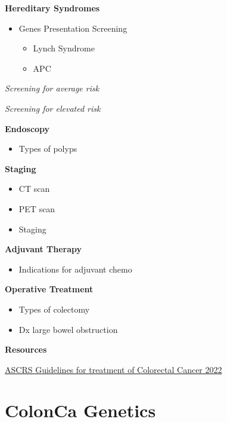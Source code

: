 \documentclass[
]{book}
\providecommand{\tightlist}{%
  \setlength{\itemsep}{0pt}\setlength{\parskip}{0pt}}
\begin{document}
\textbf{Hereditary Syndromes}

\begin{itemize}
\tightlist
\item
  Genes \textbar{} Presentation \textbar{} Screening

  \begin{itemize}
  \tightlist
  \item
    Lynch Syndrome
  \item
    APC
  \end{itemize}
\end{itemize}

\emph{Screening for average risk}

\emph{Screening for elevated risk}

\textbf{Endoscopy}

\begin{itemize}
\tightlist
\item
  Types of polyps
\end{itemize}

\textbf{Staging}

\begin{itemize}
\tightlist
\item
  CT scan
\item
  PET scan
\item
  Staging
\end{itemize}

\textbf{Adjuvant Therapy}

\begin{itemize}
\tightlist
\item
  Indications for adjuvant chemo
\end{itemize}

\textbf{Operative Treatment}

\begin{itemize}
\tightlist
\item
  Types of colectomy
\item
  Dx large bowel obstruction
\end{itemize}

\textbf{Resources}

\href{https://fascrs.org/ascrs/media/files/downloads/2022-Colon-Cancer-CPG.pdf}{ASCRS Guidelines for treatment of Colorectal Cancer 2022}

\hypertarget{ColonGenetics}{%
\chapter{ColonCa Genetics}\label{ColonGenetics}}
\end{document}
